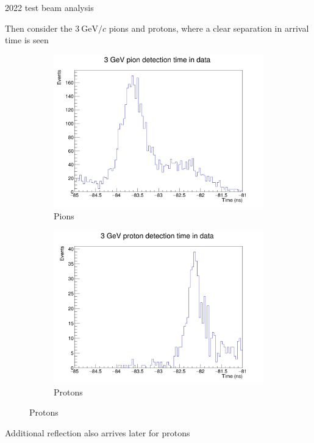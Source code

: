 \documentclass[xcolor={dvipsnames}]{beamer}
\begin{document}
\begin{frame}{2022 test beam analysis}
  \begin{center}
    \Large{Then consider the $\SI{3}{\giga\eV/c}$ pions and protons, where a clear separation in arrival time is seen}
  \end{center}
  \begin{figure}
    \centering
    \begin{subfigure}{0.5\textwidth}
      \includegraphics[width = 1.0\textwidth]{Figs/Time_Pos8_Pion_3GeV_Data.png}
      \caption{Pions}
    \end{subfigure}%
    \begin{subfigure}{0.5\textwidth}
      \includegraphics[width = 1.0\textwidth]{Figs/Time_Pos8_Proton_3GeV_Data.png}
      \caption{Protons}
    \end{subfigure}%
  \end{figure}
  \begin{center}
    Additional reflection also arrives later for protons\phantom{(}
  \end{center}
\end{frame}
\end{document}
